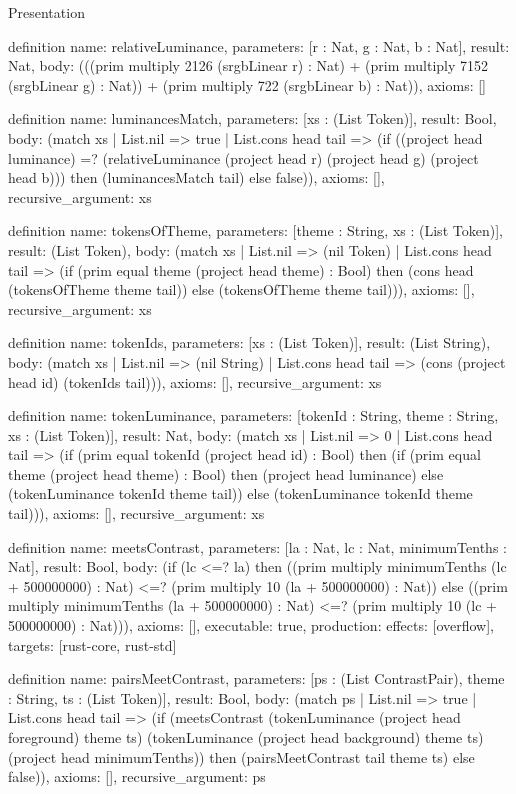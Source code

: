 \begin{lexlean}{Presentation}
\begin{semanticmodule}
definition{
  name: relativeLuminance,
  parameters: [r : Nat, g : Nat, b : Nat],
  result: Nat,
  body: (((prim multiply 2126 (srgbLinear r) : Nat) + (prim multiply 7152 (srgbLinear g) : Nat)) + (prim multiply 722 (srgbLinear b) : Nat)),
  axioms: []
}

definition{
  name: luminancesMatch,
  parameters: [xs : (List Token)],
  result: Bool,
  body: (match xs
    | List.nil => true
    | List.cons head tail => (if ((project head luminance) =? (relativeLuminance (project head r) (project head g) (project head b))) then (luminancesMatch tail) else false)),
  axioms: [],
  recursive_argument: xs
}

definition{
  name: tokensOfTheme,
  parameters: [theme : String, xs : (List Token)],
  result: (List Token),
  body: (match xs
    | List.nil => (nil Token)
    | List.cons head tail => (if (prim equal theme (project head theme) : Bool) then (cons head (tokensOfTheme theme tail)) else (tokensOfTheme theme tail))),
  axioms: [],
  recursive_argument: xs
}

definition{
  name: tokenIds,
  parameters: [xs : (List Token)],
  result: (List String),
  body: (match xs
    | List.nil => (nil String)
    | List.cons head tail => (cons (project head id) (tokenIds tail))),
  axioms: [],
  recursive_argument: xs
}

definition{
  name: tokenLuminance,
  parameters: [tokenId : String, theme : String, xs : (List Token)],
  result: Nat,
  body: (match xs
    | List.nil => 0
    | List.cons head tail => (if (prim equal tokenId (project head id) : Bool) then (if (prim equal theme (project head theme) : Bool) then (project head luminance) else (tokenLuminance tokenId theme tail)) else (tokenLuminance tokenId theme tail))),
  axioms: [],
  recursive_argument: xs
}

definition{
  name: meetsContrast,
  parameters: [la : Nat, lc : Nat, minimumTenths : Nat],
  result: Bool,
  body: (if (lc <=? la) then ((prim multiply minimumTenths (lc + 500000000) : Nat) <=? (prim multiply 10 (la + 500000000) : Nat)) else ((prim multiply minimumTenths (la + 500000000) : Nat) <=? (prim multiply 10 (lc + 500000000) : Nat))),
  axioms: [],
  executable: true,
  production: {effects: [overflow], targets: [rust-core, rust-std]}
}

definition{
  name: pairsMeetContrast,
  parameters: [ps : (List ContrastPair), theme : String, ts : (List Token)],
  result: Bool,
  body: (match ps
    | List.nil => true
    | List.cons head tail => (if (meetsContrast (tokenLuminance (project head foreground) theme ts) (tokenLuminance (project head background) theme ts) (project head minimumTenths)) then (pairsMeetContrast tail theme ts) else false)),
  axioms: [],
  recursive_argument: ps
}


\end{semanticmodule}
\end{lexlean}
